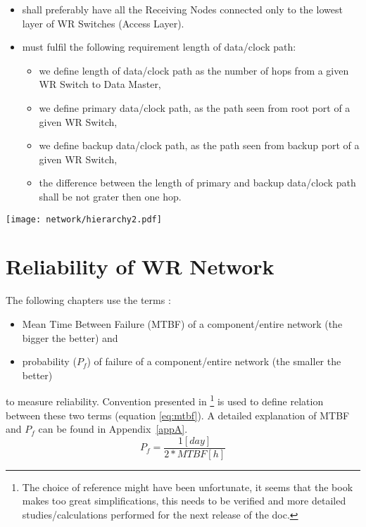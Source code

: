 \begin{itemize}
  \item shall preferably have all the Receiving Nodes connected only to the
	lowest layer of WR Switches (Access Layer).
  \item must fulfil the following requirement length of data/clock path: 
  \begin{itemize}
        \item we define length of data/clock path as the number of hops from a
	      given WR Switch to Data Master,	
        \item we define primary data/clock path, as the path seen from root
	      port of a given WR Switch,
        \item we define backup data/clock path, as the path seen from backup
	      port of a given WR Switch,
	\item the difference between the length of primary and backup data/clock
	      path shall be not grater then one hop.
  \end{itemize}
 
 \end{itemize}


\begin{center}
	\texttt{[image: network/hierarchy2.pdf]}
	\label{fig:WRtopology}
\end{center}

\section{Reliability of WR Network}
\label{reliabilityOfNetwork}

The following chapters use the terms :
\begin{itemize}
  \item Mean Time Between Failure (MTBF) of a component/entire network (the
bigger the better) and
  \item probability ($P_f$) of failure of a component/entire network (the
smaller the better)
\end{itemize}
to measure reliability. Convention presented in \cite{DesigningLSLANs}
\footnote{The choice of reference might have been unfortunate, it seems that
the book makes too great simplifications, this needs to be verified and more
detailed studies/calculations performed for the next release of the doc.} is
used to define relation between these two terms (equation \ref{eq:mtbf}). A
detailed
explanation of MTBF and $P_f$ can be found in Appendix~\ref{appA}. 
	\begin{equation}
        \label{eq:mtbf}
		P_f= \frac{1 [day]}{2*MTBF [h]}  
	\end{equation}

